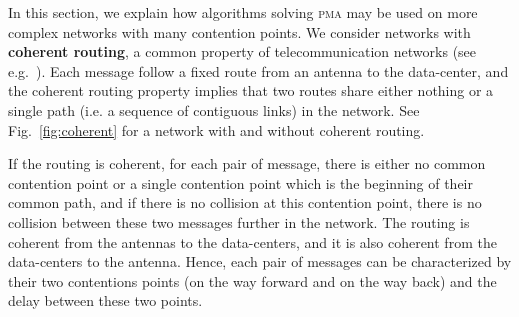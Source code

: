 \documentclass[a4paper,UKenglish,cleveref, autoref, thm-restate]{lipics-v2019}
\newcommand\pma{\textsc{pma}\xspace}
\begin{document}
In this section, we explain how algorithms solving \pma may be used on more complex networks with many contention points.
We consider networks with \textbf{coherent routing}, a common property of telecommunication networks (see e.g.~\cite{Schwiebert1996ANA}).
Each message follow a fixed route from an antenna to the data-center, and the coherent routing property implies that two routes
share either nothing or a single path (i.e. a sequence of contiguous links) in the network. See Fig.~\ref{fig:coherent} for a network with and without coherent routing.

If the routing is coherent, for each pair of message, there is either no common contention point or a single contention point
which is the beginning of their common path, and if there is no collision at this contention point, there is no collision between these two messages further in the network.
The routing is coherent from the antennas to the data-centers, and it is also coherent from the data-centers to the antenna. 
Hence, each pair of messages can be characterized by their two contentions points (on the way forward and on the way back) and the delay between these two points. 
\end{document}
